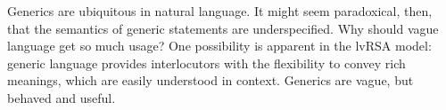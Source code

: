 \documentclass[10pt,letterpaper]{article}
\begin{document}
Generics are ubiquitous in natural language. It might seem paradoxical, then, that the semantics of generic statements are underspecified. Why should vague language get so much usage? One possibility is apparent in the lvRSA model: generic language provides interlocutors with the flexibility to convey rich meanings, which are easily understood in context. 
Generics are vague, but behaved and useful.



%
%
%
%
%
%
%
\end{document}
